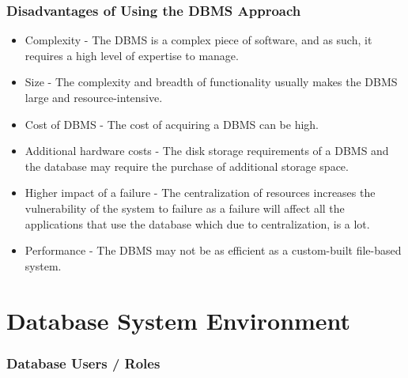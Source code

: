 \documentclass[12pt letter]{report}
\begin{document}
\subsection{Disadvantages of Using the DBMS Approach}

\begin{itemize}
  \item Complexity - The DBMS is a complex piece of software, and as such, it requires a high level of expertise to
        manage.
  \item Size - The complexity and breadth of functionality usually makes the DBMS large and resource-intensive.
  \item Cost of DBMS - The cost of acquiring a DBMS can be high.
  \item Additional hardware costs - The disk storage requirements of a DBMS and the database may require the purchase of
        additional storage space.
  \item Higher impact of a failure - The centralization of resources increases the vulnerability of the system to
        failure as a failure will affect all the applications that use the database which due to centralization, is a lot.
  \item Performance - The DBMS may not be as efficient as a custom-built file-based system.
\end{itemize}


\chapter{Database System Environment}

\subsection{Database Users / Roles}
\end{document}
